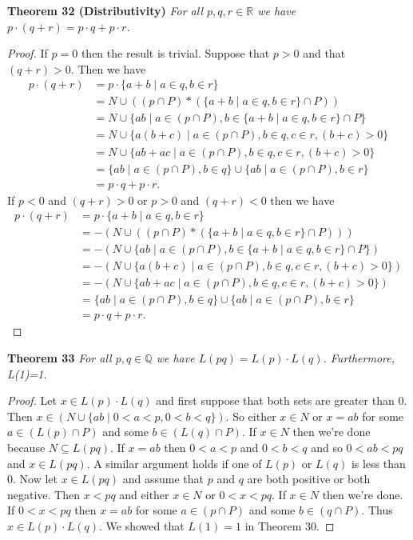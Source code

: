 \documentclass{article}
\begin{document}
\begin{flushleft}
\textbf{Theorem 32 (Distributivity)}
\textsl{For all $p,q,r \in \mathbb{R}$ we have $p \cdot (q+r) = p \cdot q + p \cdot r$.}
\begin{proof}
If $p=0$ then the result is trivial. Suppose that $p>0$ and that $(q+r)>0$. Then we have
\begin{align*}
p \cdot (q+r) &= p \cdot \{a+b \mid a \in q, b \in r\} \\
		    &= N \cup ((p \cap P) * (\{a+b \mid a \in q, b \in r\} \cap P)) \\
		    &= N \cup \{ab \mid a \in (p \cap P), b \in \{a+b \mid a \in q, b \in r\} \cap P\} \\
		    &= N \cup \{a(b+c) \mid a \in (p \cap P), b \in q, c \in r, (b+c)>0\} \\
		    &= N \cup \{ab+ac \mid a \in (p \cap P), b \in q, c \in r, (b+c)>0\} \\
		    &= \{ab \mid a \in (p \cap P), b \in q\} \cup \{ab \mid a \in (p \cap P), b \in r\} \\
		    &= p \cdot q + p \cdot r.
\end{align*}
If $p<0$ and $(q+r)>0$ or $p>0$ and $(q+r)<0$ then we have
\begin{align*}
p \cdot (q+r) &= p \cdot \{a+b \mid a \in q, b \in r\} \\
		    &= -(N \cup ((p \cap P) * (\{a+b \mid a \in q, b \in r\} \cap P))) \\
		    &= -(N \cup \{ab \mid a \in (p \cap P), b \in \{a+b \mid a \in q, b \in r\} \cap P\}) \\
		    &= -(N \cup \{a(b+c) \mid a \in (p \cap P), b \in q, c \in r, (b+c)>0\}) \\
		    &= -(N \cup \{ab+ac \mid a \in (p \cap P), b \in q, c \in r, (b+c)>0\}) \\
		    &= \{ab \mid a \in (p \cap P), b \in q\} \cup \{ab \mid a \in (p \cap P), b \in r\} \\
		    &= p \cdot q + p \cdot r.
\end{align*}
\end{proof}

\textbf{Theorem 33}
\textsl{For all $p,q \in \mathbb{Q}$ we have $L(pq)=L(p) \cdot L(q)$. Furthermore, L(1)=1.}
\begin{proof}
Let $x \in L(p) \cdot L(q)$ and first suppose that both sets are greater than $0$. Then $x \in (N \cup \{ab \mid 0<a<p, 0<b<q\})$. So either $x \in N$ or $x = ab$ for some $a \in (L(p) \cap P)$ and some $b \in (L(q) \cap P)$. If $x \in N$ then we're done because $N \subseteq L(pq)$. If $x=ab$ then $0<a<p$ and $0<b<q$ and so $0<ab<pq$ and $x \in L(pq)$. A similar argument holds if one of $L(p)$ or $L(q)$ is less than $0$. Now let $x \in L(pq)$ and assume that $p$ and $q$ are both positive or both negative. Then $x<pq$ and either $x \in N$ or $0<x<pq$. If $x \in N$ then we're done. If $0<x<pq$ then $x=ab$ for some $a \in (p \cap P)$ and some $b \in (q \cap P)$. Thus $x \in L(p) \cdot L(q)$. We showed that $L(1) = 1$ in Theorem 30.
\end{proof}


\end{flushleft}
\end{document}
